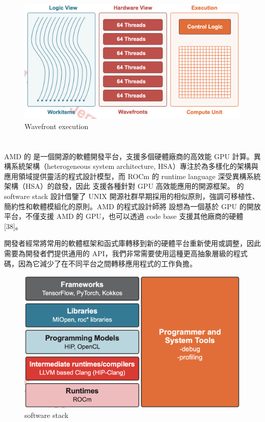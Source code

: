 \begin{figure}[h]
    \centering
    \includegraphics[width=0.8\linewidth]{FileAusiliari/Screenshots/Figure1-3.png}
    \caption{Wavefront execution}
    \label{fig:lds}
\end{figure}

\section{}

AMD 的  是一個開源的軟體開發平台，支援多個硬體廠商的高效能 GPU 計算。異構系統架構（heterogeneous system architecture, HSA）專注於為多樣化的架構與應用領域提供靈活的程式設計模型，而 ROCm 的 runtime language 深受異構系統架構（HSA）的啟發，因此  支援各種針對 GPU 高效能應用的開源框架。 的 software stack 設計借鑒了 UNIX 開源社群早期採用的相似原則，強調可移植性、簡約性和軟體模組化的原則。AMD 的程式設計師將  設想為一個基於 GPU 的開放平台，不僅支援 AMD 的 GPU，也可以透過  code base 支援其他廠商的硬體 [38]。

開發者經常將常用的軟體框架和函式庫轉移到新的硬體平台重新使用或調整，因此需要為開發者們提供通用的 API，我們非常需要使用這種更高抽象層級的程式碼，因為它減少了在不同平台之間轉移應用程式的工作負擔。

\begin{figure}[h]
    \centering
    \includegraphics[width=0.8\linewidth]{FileAusiliari/Screenshots/Figure1-4.png}
    \caption{ software stack}
    \label{fig:lds}
\end{figure}

